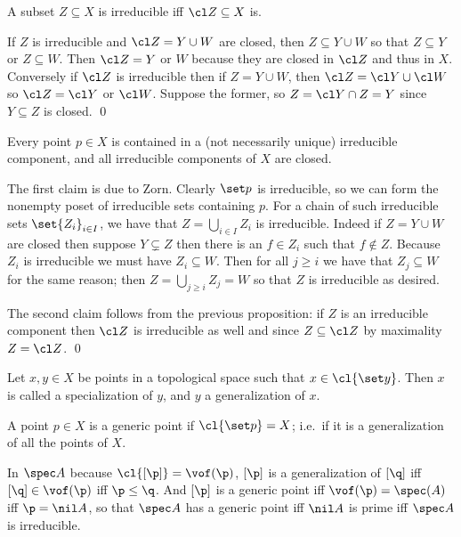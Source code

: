 \edefn

\bprop

    A subset $Z\subseteq X$ is irreducible iff $\cl Z\subseteq X$ is.

\eprop

\bproof

    If $Z$ is irreducible and $\cl Z=Y\cup W$ are closed, then $Z\subseteq Y\cup W$ so that $Z\subseteq Y$ or $Z\subseteq W$.
    Then $\cl Z=Y$ or $W$ because they are closed in $\cl Z$ and thus in $X$.
    Conversely if $\cl Z$ is irreducible then if $Z=Y\cup W$, then $\cl Z=\cl Y\cup\cl W$ so $\cl Z=\cl Y$ or $\cl W$.
    Suppose the former, so $Z=\cl Y\cap Z=Y$ since $Y\subseteq Z$ is closed.
    \qed

\eproof

\bprop

    Every point $p\in X$ is contained in a (not necessarily unique) irreducible component, and all irreducible components of $X$ are closed.

\eprop

\bproof

    The first claim is due to Zorn.
    Clearly $\set p$ is irreducible, so we can form the nonempty poset of irreducible sets containing $p$.
    For a chain of such irreducible sets $\set{Z_i}_{i\in I}$, we have that $Z=\bigcup_{i\in I}Z_i$ is irreducible.
    Indeed if $Z=Y\cup W$ are closed then suppose $Y\subsetneq Z$ then there is an $f\in Z_i$ such that $f\notin Z$.
    Because $Z_i$ is irreducible we must have $Z_i\subseteq W$.
    Then for all $j\geq i$ we have that $Z_j\subseteq W$ for the same reason; then $Z=\bigcup_{j\geq i}Z_j=W$ so that $Z$ is irreducible as desired.

    The second claim follows from the previous proposition: if $Z$ is an irreducible component then $\cl Z$ is irreducible as well and since $Z\subseteq\cl Z$
    by maximality $Z=\cl Z$.
    \qed

\eproof

\bdefn

    Let $x,y\in X$ be points in a topological space such that $x\in\cl{\set y}$.
    Then $x$ is called a {\emphcolor specialization} of $y$, and $y$ a {\emphcolor generalization} of $x$.

    A point $p\in X$ is a {\emphcolor generic point} if $\cl{\set p}=X$; i.e.\ if it is a generalization of all the points of $X$.

\edefn

In $\spec A$ because $\cl{[\p]}=\vof(\p)$, $[\p]$ is a generalization of $[\q]$ iff $[\q]\in\vof(\p)$ iff $\p\leq\q$.
And $[\p]$ is a generic point iff $\vof(\p)=\spec(A)$ iff $\p=\nil A$, so that $\spec A$ has a generic point iff $\nil A$ is prime iff $\spec A$ is irreducible.

